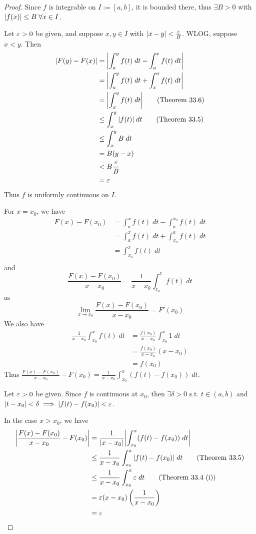 \documentclass{article}
\begin{document}
  \begin{proof}
    Since $f$ is integrable on $I := [a, b]$, it is bounded there, thus $\exists B > 0$ with $\abs{f(x)} \leq B \; \forall x\in I$.

    Let $\varepsilon > 0$ be given, and suppose $x, y \in I$ with $\abs{x-y} < \frac{\varepsilon}{B}$. WLOG, suppose $x < y$. Then
    \begin{align*}
      \abs{F(y) - F(x)} &= \abs{\int_a^y f(t)\; dt - \int_a^x f(t) \; dt}\\
      &= \abs{\int_a^y f(t) \; dt + \int_x^a f(t) \; dt}\\
      &= \abs{\int_x^y f(t) \; dt} \tag{Theorem 33.6}\\
      &\leq \int_x^y \abs{f(t)} \; dt \tag{Theorem 33.5}\\
      &\leq \int_x^y B \; dt\\\
      &= B(y - x)\\
      &< B \frac{\varepsilon}{B}\\
      &= \varepsilon
    \end{align*}
    Thus $f$ is uniformly continuous on $I$.

    For $x = x_0$, we have
    \begin{align*}
      F(x) - F(x_0) &= \int_a^x f(t) \; dt - \int_a^{x_0} f(t) \; dt\\
      &= \int_a^x f(t) \; dt + \int_{x_0}^a f(t) \; dt\\
      &= \int_{x_0}^x f(t) \; dt\\
    \end{align*} and \[
      \frac{F(x) - F(x_0)}{x-x_0} = \frac{1}{x - x_0} \int_{x_0}^x f(t) \; dt
    \] as \[
      \lim_{x \to x_0} \frac{F(x) - F(x_0)}{x-x_0} = F'(x_0)
    \]
    We also have
    \begin{align*}
      \frac{1}{x - x_0} \int_{x_0}^x f(t) \; dt &= \frac{f(x_0)}{x - x_0} \int_{x_0}^x 1 \; dt\\
      &= \frac{f(x_0)}{x- x_0}(x-x_0)\\
      &= f(x_0)
    \end{align*}
    Thus $\frac{F(x) - F(x_0)}{x - x_0} - F(x_0) = \frac{1}{x-x_0} \int_{x_0}^x (f(t) - f(x_0)) \; dt$.

    Let $\varepsilon > 0$ be given. Since $f$ is continuous at $x_0$, then $\exists \delta > 0$ s.t. $t \in (a, b)$ and $|t - x_0| < \delta \implies \abs{f(t) - f(x_0)} < \varepsilon$.

    In the case $x > x_0$, we have
    \begin{align*}
      \abs{\frac{F(x) - F(x_0)}{x - x_0} - F(x_0)} &= \frac{1}{\abs{x - x_0}} \abs{\int_{x_0}^x (f(t) - f(x_0)) \; dt}\\
      &\leq \frac{1}{x-x_0} \int_{x_0}^x \abs{f(t) - f(x_0)} \; dt \tag{Theorem 33.5}\\
      &\leq \frac{1}{x -x_0}\int_{x_0}^x \varepsilon \; dt \tag{Theorem 33.4 (i)}\\
      &= \varepsilon (x-x_0)\left(\frac{1}{x-x_0}\right)\\
      &= \varepsilon
    \end{align*}


\end{proof}
\end{document}
